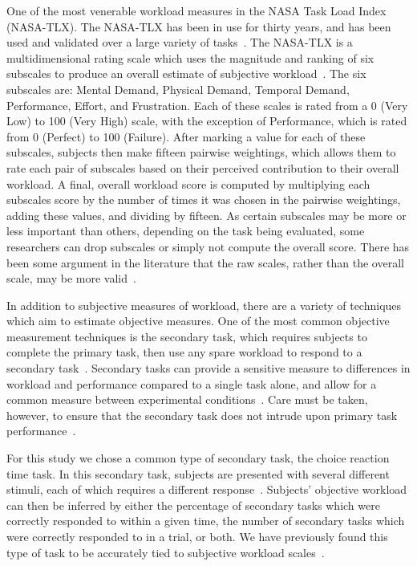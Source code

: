 \documentclass{paper}
\begin{document}
One of the most venerable workload measures in the NASA Task Load Index (NASA-TLX).
The NASA-TLX has been in use for thirty years, and has been used and validated over a large variety of tasks~\cite{Hart2006}.
The NASA-TLX is a multidimensional rating scale which uses the magnitude and ranking of six subscales to produce an overall estimate of subjective workload~\cite{Hart1988}.
The six subscales are: Mental Demand, Physical Demand, Temporal Demand, Performance, Effort, and Frustration.
Each of these scales is rated from a 0 (Very Low) to 100 (Very High) scale, with the exception of Performance, which is rated from 0 (Perfect) to 100 (Failure).
After marking a value for each of these subscales, subjects then make fifteen pairwise weightings, which allows them to rate each pair of subscales based on their perceived contribution to their overall workload.
A final, overall workload score is computed by multiplying each subscales score by the number of times it was chosen in the pairwise weightings, adding these values, and dividing by fifteen.
As certain subscales may be more or less important than others, depending on the task being evaluated, some researchers can drop subscales or simply not compute the overall score.
There has been some argument in the literature that the raw scales, rather than the overall scale, may be more valid~\cite{bustamante2008measurement}.

In addition to subjective measures of workload, there are a variety of techniques which aim to estimate objective measures.
One of the most common objective measurement techniques is the secondary task, which requires subjects to complete the primary task, then use any spare workload to respond to a secondary task~\cite{gawron2008human}.
Secondary tasks can provide a sensitive measure to differences in workload and performance compared to a single task alone, and allow for a common measure between experimental conditions~\cite{slocum1971meaningful}.
Care must be taken, however, to ensure that the secondary task does not intrude upon primary task performance~\cite{williges1979behavioral}.

For this study we chose a common type of secondary task, the choice reaction time task.
In this secondary task, subjects are presented with several different stimuli, each of which requires a different response~\cite{lysaght1989operator}.
Subjects' objective workload can then be inferred by either the percentage of secondary tasks which were correctly responded to within a given time, the number of secondary tasks which were correctly responded to in a trial, or both.
We have previously found this type of task to be accurately tied to subjective workload scales~\cite{Karasinski2017}.
\end{document}

